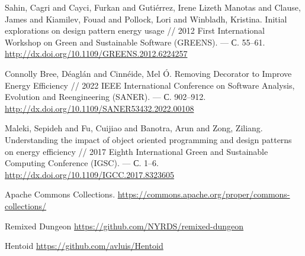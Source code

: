 \documentclass{math-mech-sci}
\begin{document}
\begin{thebibliography}{8}
 Sahin, Cagri and Cayci, Furkan and Gutiérrez, Irene Lizeth Manotas and Clause, James and Kiamilev, Fouad and Pollock, Lori and Winbladh, Kristina. Initial explorations on design pattern energy usage //
  2012 First International Workshop on Green and Sustainable Software (GREENS).  --- %
  С. 55--61.
  \href{http://dx.doi.org/10.1109/GREENS.2012.6224257}{http://dx.doi.org/10.1109/GREENS.2012.6224257}

 Connolly Bree, Déaglán and Cinnéide, Mel Ó. Removing Decorator to Improve Energy Efficiency //
  2022 IEEE International Conference on Software Analysis, Evolution and Reengineering (SANER).  --- %
  С. 902--912.
  \href{http://dx.doi.org/10.1109/SANER53432.2022.00108}{http://dx.doi.org/10.1109/SANER53432.2022.00108}

 Maleki, Sepideh and Fu, Cuijiao and Banotra, Arun and Zong, Ziliang. Understanding the impact of object oriented programming and design patterns on energy efficiency //
  2017 Eighth International Green and Sustainable Computing Conference (IGSC).  --- %
  С. 1--6.
  \href{http://dx.doi.org/10.1109/IGCC.2017.8323605}{http://dx.doi.org/10.1109/IGCC.2017.8323605}

 Apache Commons Collections.
  \href{https://commons.apache.org/proper/commons-collections/}{https://commons.apache.org/proper/commons-collections/}

 Remixed Dungeon
  \href{https://github.com/NYRDS/remixed-dungeon}{https://github.com/NYRDS/remixed-dungeon}

 Hentoid
  \href{https://github.com/avluis/Hentoid}{https://github.com/avluis/Hentoid}


\end{thebibliography}
\end{document}
